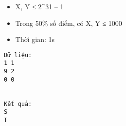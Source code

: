 \begin{itemize}
	\item     X, Y ≤ 2^31 – 1   
	\item     Trong 50\% số điểm, có X, Y ≤ 1000   
	\item     Thời gian: 1s   
\end{itemize}
\begin{verbatim}
Dữ liệu:
1 1
9 2
0 0


Kết quả:
S
T

\end{verbatim}